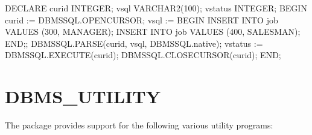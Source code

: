 \documentclass[letterpaper,10pt,english,openany,oneside]{sphinxmanual}
\begin{document}
%
\begin{sphinxVerbatim}[commandchars=\\\{\}]
DECLARE
    curid           INTEGER;
    v\PYGZus{}sql           VARCHAR2(100);
    v\PYGZus{}status        INTEGER;
BEGIN
    curid := DBMS\PYGZus{}SQL.OPEN\PYGZus{}CURSOR;
    v\PYGZus{}sql := \PYGZsq{}BEGIN \PYGZsq{} \textbar{}\textbar{}
               \PYGZsq{}INSERT INTO job VALUES (300, \PYGZsq{}\PYGZsq{}MANAGER\PYGZsq{}\PYGZsq{}); \PYGZsq{}  \textbar{}\textbar{}
               \PYGZsq{}INSERT INTO job VALUES (400, \PYGZsq{}\PYGZsq{}SALESMAN\PYGZsq{}\PYGZsq{}); \PYGZsq{} \textbar{}\textbar{}
             \PYGZsq{}END;\PYGZsq{};
    DBMS\PYGZus{}SQL.PARSE(curid, v\PYGZus{}sql, DBMS\PYGZus{}SQL.native);
    v\PYGZus{}status := DBMS\PYGZus{}SQL.EXECUTE(curid);
    DBMS\PYGZus{}SQL.CLOSE\PYGZus{}CURSOR(curid);
END;
\end{sphinxVerbatim}

\newpage


\section{DBMS\_UTILITY}
\label{\detokenize{dbms_utility::doc}}\label{\detokenize{dbms_utility:dbms-utility}}
The  package provides support for the following various
utility programs:
\end{document}
